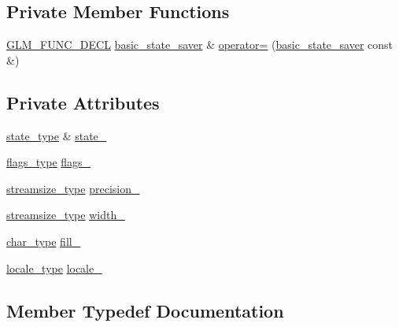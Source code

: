 \subsection*{Private Member Functions}
\begin{DoxyCompactItemize}
\item 
\hyperlink{setup_8hpp_ab2d052de21a70539923e9bcbf6e83a51}{G\+L\+M\+\_\+\+F\+U\+N\+C\+\_\+\+D\+E\+CL} \hyperlink{classglm_1_1io_1_1basic__state__saver}{basic\+\_\+state\+\_\+saver} \& \hyperlink{classglm_1_1io_1_1basic__state__saver_add3605cf6a261400ca499be074baa4db}{operator=} (\hyperlink{classglm_1_1io_1_1basic__state__saver}{basic\+\_\+state\+\_\+saver} const \&)
\end{DoxyCompactItemize}
\subsection*{Private Attributes}
\begin{DoxyCompactItemize}
\item 
\hyperlink{classglm_1_1io_1_1basic__state__saver_a84787cc03192543bfe67ef25e7f20aa6}{state\+\_\+type} \& \hyperlink{classglm_1_1io_1_1basic__state__saver_a969e854089f2df42ee0050d38cc70903}{state\+\_\+}
\item 
\hyperlink{classglm_1_1io_1_1basic__state__saver_a73ca8320543524c7ab7f1ce97d30aff6}{flags\+\_\+type} \hyperlink{classglm_1_1io_1_1basic__state__saver_a2017c6e006a9e5c0c1ee191aee59c835}{flags\+\_\+}
\item 
\hyperlink{classglm_1_1io_1_1basic__state__saver_a0a4c44df9a4fcf7531af6da7698e0931}{streamsize\+\_\+type} \hyperlink{classglm_1_1io_1_1basic__state__saver_a1b442206b28b324603599175285fb55a}{precision\+\_\+}
\item 
\hyperlink{classglm_1_1io_1_1basic__state__saver_a0a4c44df9a4fcf7531af6da7698e0931}{streamsize\+\_\+type} \hyperlink{classglm_1_1io_1_1basic__state__saver_a7c2f48c587295d3717b0b6790f78034d}{width\+\_\+}
\item 
\hyperlink{classglm_1_1io_1_1basic__state__saver_ae6abb8e2e6bd4a044e953746691ffe8e}{char\+\_\+type} \hyperlink{classglm_1_1io_1_1basic__state__saver_abf8166290d087051954306facad38e00}{fill\+\_\+}
\item 
\hyperlink{classglm_1_1io_1_1basic__state__saver_acc657f13df9c1fd68e1014b96ff615cb}{locale\+\_\+type} \hyperlink{classglm_1_1io_1_1basic__state__saver_a108385f01212b427ebae048eaf181e0d}{locale\+\_\+}
\end{DoxyCompactItemize}


\subsection{Member Typedef Documentation}
\mbox{\label{classglm_1_1io_1_1basic__state__saver_ae6abb8e2e6bd4a044e953746691ffe8e}} 
